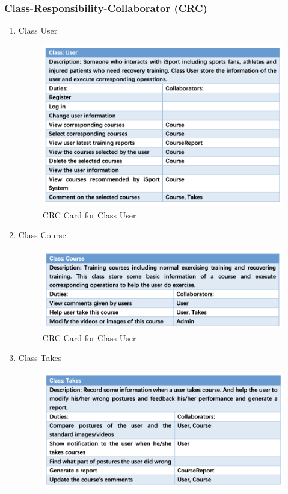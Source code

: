 \documentclass[16pt]{scrreprt}
\begin{document}
\subsubsection{Class-Responsibility-Collaborator (CRC)}
\begin{enumerate}
    \item Class User
        \begin{figure}[H]
            \centering
            \includegraphics[width=1.1\textwidth]{figures/User.png}
            \caption{CRC Card for Class User}
            \label{fig:user}
        \end{figure}
    \item Class Course
        \begin{figure}[H]
            \centering
            \includegraphics[width=1.1\textwidth]{figures/Course.png}
            \caption{CRC Card for Class User}
            \label{fig:course}
        \end{figure}
    \item Class Takes
        \begin{figure}[H]
            \centering
            \includegraphics[width=1.1\textwidth]{figures/Takes.png}

\end{figure}
\end{enumerate}
\end{document}
